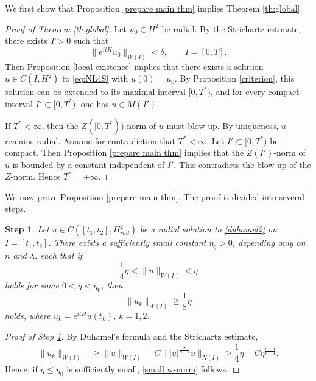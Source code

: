 \documentclass[11pt,a4paper]{article}
\numberwithin{equation}{section}
\newtheorem{step}{Step}[section]
\begin{document}
We first show that Proposition \ref{prepare main thm} implies Theorem \ref{th:global}.

\begin{proof}[Proof of Theorem \ref{th:global}]
Let $u_{0} \in H^{2}$ be radial. By the Strichartz estimate, there exists $T > 0$ such that
\[
\|e^{itH}u_{0}\|_{W(I)} < \delta,\qquad I = [0, T].
\]
Then Proposition \ref{local existence} implies that there exists a solution $u \in C(I, H^{2})$ to \eqref{eq:NL4S} with $u(0)=u_{0}$.
By Proposition \ref{criterion}, this solution can be extended to its maximal interval $[0, T^{*})$, and for every compact interval $I' \subset [0, T^{*})$, one has $u \in M(I')$.

If $T^{*} < \infty$, then the $Z([0,T^{*}))$-norm of $u$ must blow up.
By uniqueness, $u$ remains radial.
Assume for contradiction that $T^{*} < \infty$.
Let $I' \subset [0, T^{*})$ be compact. Then Proposition \ref{prepare main thm} implies that the $Z(I')$-norm of $u$ is bounded by a constant independent of $I'$.
This contradicts the blow-up of the $Z$-norm.
Hence $T^{*} = +\infty$.
\end{proof}

We now prove Proposition \ref{prepare main thm}. The proof is divided into several steps.

\begin{step}\label{step1}
Let $u \in C([t_{1}, t_{2}], H^{2}_{rad})$ be a radial solution to \eqref{duhamel2} on $I = [t_{1}, t_{2}]$.
There exists a sufficiently small constant $\eta_{0} > 0$, depending only on $n$ and $\lambda$, such that if
\begin{equation}\label{small condition in main thm}
\dfrac{1}{4}\eta < \|u\|_{W(I)} < \eta
\end{equation}
holds for some $0 < \eta < \eta_{0}$, then
\begin{equation}\label{small w-norm}
\|u_{k}\|_{W(I)} \geq \dfrac{1}{8} \eta
\end{equation}
holds, where $u_{k} = e^{itH}u(t_{k})$, $k = 1, 2$.
\end{step}

\begin{proof}[Proof of Step \ref{step1}]
By Duhamel's formula and the Strichartz estimate,
\begin{align*}
\|u_{k}\|_{W(I)}
&\geq \|u\|_{W(I)} - C\||u|^{\frac{8}{n-4}}u\|_{N(I)}
\geq \dfrac{1}{4} \eta - C \eta^{\frac{n+4}{n-4}}.
\end{align*}
Hence, if $\eta \leq \eta_{0}$ is sufficiently small, \eqref{small w-norm} follows.
\end{proof}
\end{document}
